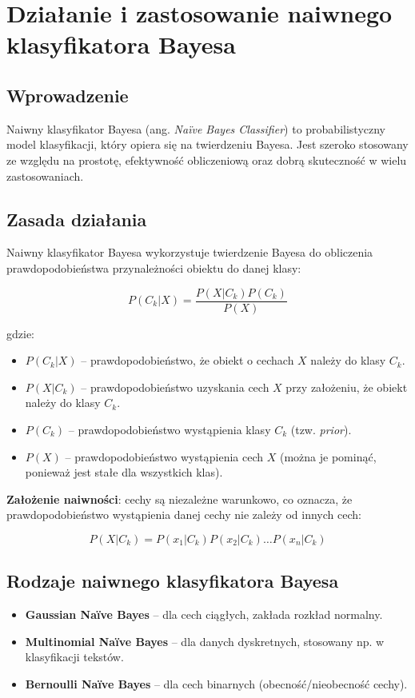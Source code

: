 \section{Działanie i zastosowanie naiwnego klasyfikatora Bayesa}

\subsection{Wprowadzenie}
Naiwny klasyfikator Bayesa (ang. \textit{Naïve Bayes Classifier}) to probabilistyczny model klasyfikacji, który opiera się na twierdzeniu Bayesa. Jest szeroko stosowany ze względu na prostotę, efektywność obliczeniową oraz dobrą skuteczność w wielu zastosowaniach.

\subsection{Zasada działania}
Naiwny klasyfikator Bayesa wykorzystuje twierdzenie Bayesa do obliczenia prawdopodobieństwa przynależności obiektu do danej klasy:

\[
P(C_k | X) = \frac{P(X | C_k) P(C_k)}{P(X)}
\]

gdzie:
\begin{itemize}
    \item \( P(C_k | X) \) – prawdopodobieństwo, że obiekt o cechach \( X \) należy do klasy \( C_k \).
    \item \( P(X | C_k) \) – prawdopodobieństwo uzyskania cech \( X \) przy założeniu, że obiekt należy do klasy \( C_k \).
    \item \( P(C_k) \) – prawdopodobieństwo wystąpienia klasy \( C_k \) (tzw. \textit{prior}).
    \item \( P(X) \) – prawdopodobieństwo wystąpienia cech \( X \) (można je pominąć, ponieważ jest stałe dla wszystkich klas).
\end{itemize}

\textbf{Założenie naiwności}: cechy są niezależne warunkowo, co oznacza, że prawdopodobieństwo wystąpienia danej cechy nie zależy od innych cech:

\[
P(X | C_k) = P(x_1 | C_k) P(x_2 | C_k) \dots P(x_n | C_k)
\]

\subsection{Rodzaje naiwnego klasyfikatora Bayesa}
\begin{itemize}
    \item \textbf{Gaussian Naïve Bayes} – dla cech ciągłych, zakłada rozkład normalny.
    \item \textbf{Multinomial Naïve Bayes} – dla danych dyskretnych, stosowany np. w klasyfikacji tekstów.
    \item \textbf{Bernoulli Naïve Bayes} – dla cech binarnych (obecność/nieobecność cechy).
\end{itemize}

